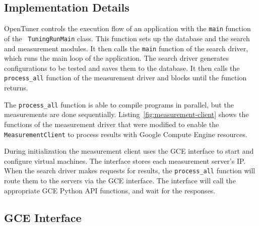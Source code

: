\documentclass[a4paper, 12pt]{article}
\begin{document}
\subsection{Implementation Details}
\label{sec:details}

OpenTuner controls the execution flow of an application with the
\texttt{\footnotesize main} function of the \texttt{\footnotesize
TuningRunMain} class. This function sets up the database and the search and
measurement modules. It then calls the \texttt{\footnotesize main} function of
the search driver, which runs the main loop of the application.  The search
driver generates configurations to be tested and saves them to the database. It
then calls the \texttt{\footnotesize process\_all} function of the measurement
driver and blocks until the function returns.



The \texttt{\footnotesize process\_all} function is able to compile programs in
parallel, but the measurements are done sequentially.
Listing~\ref{fig:measurement-client} shows the functions of the measurement
driver that were modified to enable the \texttt{\footnotesize
MeasurementClient} to process results with Google Compute Engine resources.

During initialization the measurement client uses the GCE interface to start
and configure virtual machines. The interface stores each measurement
server's IP.  When the search driver makes requests for results, the
\texttt{\footnotesize process\_all} function will route them to the servers via
the GCE interface.  The interface will call the appropriate GCE Python API
functions, and wait for the responses.


\subsection{GCE Interface}
\label{sec:gce}

\end{document}

